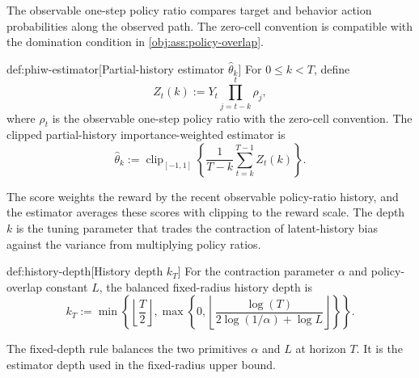 \documentclass[11pt]{article}
\begin{document}
The observable one-step policy ratio  compares target and behavior action probabilities along the observed path. The zero-cell convention is compatible with the domination condition in \cref{obj:ass:policy-overlap}.

\begin{definitionv}{def:phiw-estimator}[Partial-history estimator \(\widehat\theta_k\)]
For \(0\le k<T\), define
\[
Z_t(k)
:=
Y_t\prod_{j=t-k}^{t}\rho_j,
\]
where \(\rho_t\) is the observable one-step policy ratio with the zero-cell convention. The clipped partial-history importance-weighted estimator is
\[
\widehat\theta_k
:=
\operatorname{clip}_{[-1,1]}
\left\{
\frac{1}{T-k}\sum_{t=k}^{T-1} Z_t(k)
\right\}.
\]
\end{definitionv}

The score  weights the reward by the recent observable policy-ratio history, and the estimator  averages these scores with clipping to the reward scale. The depth \(k\) is the tuning parameter that trades the contraction of latent-history bias against the variance from multiplying policy ratios.

\begin{definitionv}{def:history-depth}[History depth \(k_T\)]
For the contraction parameter \(\alpha\) and policy-overlap constant \(L\), the balanced fixed-radius history depth is
\[
k_T
:=
\min\left\{
\left\lfloor\frac{T}{2}\right\rfloor,
\max\left\{
0,
\left\lfloor
\frac{\log(T)}{2\log(1/\alpha)+\log L}
\right\rfloor
\right\}
\right\}.
\]
\end{definitionv}

The fixed-depth rule  balances the two primitives \(\alpha\) and \(L\) at horizon \(T\). It is the estimator depth used in the fixed-radius upper bound.
\end{document}

